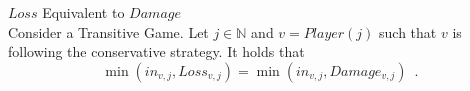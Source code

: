 \begin{lemmagr}{$Loss$ Equivalent to $Damage$} \ \\
  Consider a Transitive Game. Let $j \in \mathbb{N}$ and $v = Player\left(j\right)$ such that $v$ is following the
  conservative strategy. It holds that
  \begin{equation*}
    \min\left(in_{v, j}, Loss_{v, j}\right) = \min\left(in_{v, j}, Damage_{v, j}\right) \enspace.
  \end{equation*}
\end{lemmagr}
